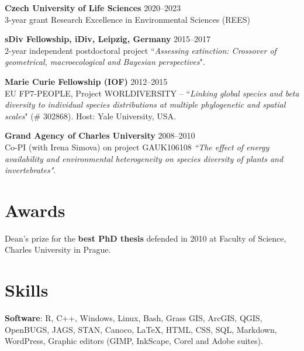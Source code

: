 \begin{innerlist}

\item[]{\bf Czech University of Life Sciences}
\hfill {2020--2023} \\
3-year grant Research Excellence in Environmental Sciences (REES)
\\


\item[]{\bf sDiv Fellowship, iDiv, Leipzig, Germany}
\hfill {2015--2017} \\
2-year independent postdoctoral project ``\textit{Assessing extinction: Crossover of geometrical, macroecological and Bayesian perspectives}".
\\

\item[]{\bf Marie Curie Fellowship (IOF)}
\hfill {2012--2015} \\
EU FP7-PEOPLE, Project WORLDIVERSITY -- ``\textit{Linking global species and beta diversity to individual species distributions at multiple phylogenetic and spatial scales}"  (\# 302868). Host: Yale University, USA.
\\

\item[]{\bf Grand Agency of Charles University}
\hfill {2008--2010} \\
Co-PI (with Irena Simova) on project GAUK106108  \textit{``The effect of energy availability and environmental heterogeneity on species diversity of plants and invertebrates"}. 

\end{innerlist}

\HRule

\section{Awards}

Dean's prize for the \textbf{best PhD thesis} defended in 2010 at Faculty of Science, Charles University in Prague.

\HRule

\section{Skills}

{\bf Software}: R, C++, Windows, Linux, Bash, Grass GIS, ArcGIS, QGIS, OpenBUGS, JAGS, STAN, Canoco, \LaTeX, HTML, CSS, SQL, Markdown, WordPress, Graphic editors (GIMP, InkScape, Corel and Adobe suites).

